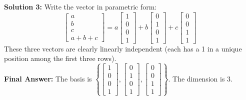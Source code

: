 \documentclass{article}
\begin{document}
\textbf{Solution 3:}
Write the vector in parametric form:
$$ \begin{bmatrix} a \\ b \\ c \\ a+b+c \end{bmatrix} = a \begin{bmatrix} 1 \\ 0 \\ 0 \\ 1 \end{bmatrix} + b \begin{bmatrix} 0 \\ 1 \\ 0 \\ 1 \end{bmatrix} + c \begin{bmatrix} 0 \\ 0 \\ 1 \\ 1 \end{bmatrix} $$
These three vectors are clearly linearly independent (each has a 1 in a unique position among the first three rows). \\
\textbf{Final Answer:} The basis is $\left\{ \begin{bmatrix} 1 \\ 0 \\ 0 \\ 1 \end{bmatrix}, \begin{bmatrix} 0 \\ 1 \\ 0 \\ 1 \end{bmatrix}, \begin{bmatrix} 0 \\ 0 \\ 1 \\ 1 \end{bmatrix} \right\}$. The dimension is 3. \\
\end{document}
